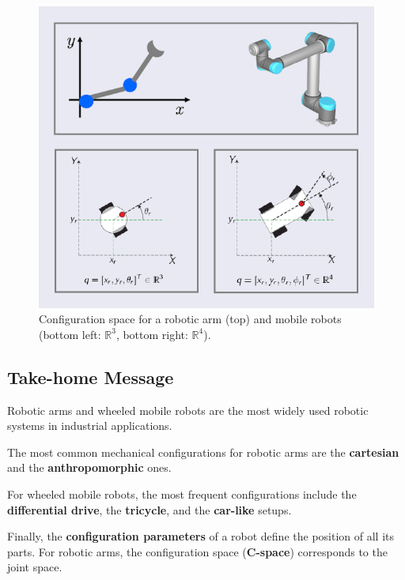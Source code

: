 \begin{figure}[H]
  \centering
  \includegraphics[width=0.9\linewidth]{imgs/configuration_space_examples.png}
  \caption{Configuration space for a robotic arm (top) and mobile robots (bottom left: $\mathbb{R}^3$, bottom right: $\mathbb{R}^4$).}
\end{figure}

\hfill

\subsection{Take-home Message}

Robotic arms and wheeled mobile robots are the most widely used robotic systems in industrial applications.

The most common mechanical configurations for robotic arms are the \textbf{cartesian} and the \textbf{anthropomorphic} ones.

For wheeled mobile robots, the most frequent configurations include the \textbf{differential drive}, the \textbf{tricycle}, and the \textbf{car-like} setups.

Finally, the \textbf{configuration parameters} of a robot define the position of all its parts. For robotic arms, the configuration space (\textbf{C-space}) corresponds to the joint space.

\newpage
